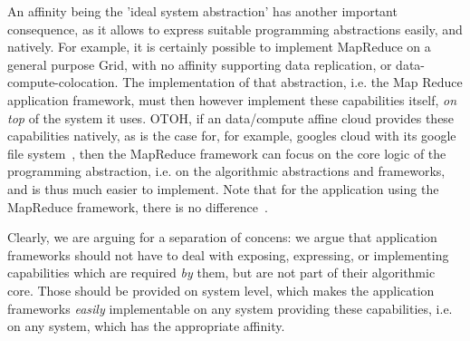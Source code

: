 \documentclass{article}
\newcommand{\I}[1]{\textit{#1}}
\begin{document}

  An affinity being the 'ideal system abstraction' has another
  important consequence, as it allows to express suitable programming
  abstractions easily, and natively.  For example, it is certainly
  possible to implement MapReduce on a general purpose Grid, with no
  affinity supporting data replication, or data-compute-colocation.
  The implementation of that abstraction, i.e. the Map Reduce
  application framework, must then however implement these
  capabilities itself, \I{on top} of the system it uses.  OTOH, if an
  data/compute affine cloud provides these capabilities natively, as
  is the case for, for example, googles cloud with its google file
  system~\cite{google}, then the MapReduce framework can focus on the
  core logic of the programming abstraction, i.e. on the algorithmic
  abstractions and frameworks, and is thus much easier to implement.
  Note that for the application using the MapReduce framework, there
  is no difference~\cite{saga-map-reduce}.

  Clearly, we are arguing for a separation of concens:  we argue that
  application frameworks should not have to deal with exposing,
  expressing, or implementing capabilities which are required \I{by}
  them, but are not part of their algorithmic core.  Those should be
  provided on system level, which makes the application frameworks
  \I{easily} implementable on any system providing these capabilities,
  i.e. on any system, which has the appropriate affinity.
\end{document}
